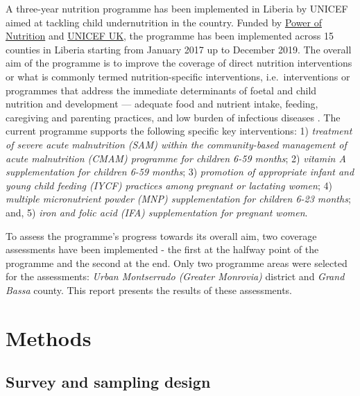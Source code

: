 \documentclass[12pt,a4paper]{article}
\begin{document}
A three-year nutrition programme has been implemented in Liberia by UNICEF aimed at tackling child undernutrition in the country. Funded by \href{http://www.powerofnutrition.org}{Power of Nutrition} and \href{https://www.unicef.org.uk}{UNICEF UK}, the programme has been implemented across 15 counties in Liberia starting from January 2017 up to December 2019. The overall aim of the programme is to improve the coverage of direct nutrition interventions or what is commonly termed nutrition-specific interventions, i.e.~interventions or programmes that address the immediate determinants of foetal and child nutrition and development --- adequate food and nutrient intake, feeding, caregiving and parenting practices, and low burden of infectious diseases \citep{Bhutta:2013ks, Ruel:2013kr}. The current programme supports the following specific key interventions: 1) \emph{treatment of severe acute malnutrition (SAM) within the community-based management of acute malnutrition (CMAM) programme for children 6-59 months}; 2) \emph{vitamin A supplementation for children 6-59 months}; 3) \emph{promotion of appropriate infant and young child feeding (IYCF) practices among pregnant or lactating women}; 4) \emph{multiple micronutrient powder (MNP) supplementation for children 6-23 months}; and, 5) \emph{iron and folic acid (IFA) supplementation for pregnant women}.

To assess the programme's progress towards its overall aim, two coverage assessments have been implemented - the first at the halfway point of the programme and the second at the end. Only two programme areas were selected for the assessments: \emph{Urban Montserrado (Greater Monrovia)} district and \emph{Grand Bassa} county. This report presents the results of these assessments.

\hypertarget{methods}{%
\section{Methods}\label{methods}}

\hypertarget{sample-design}{%
\subsection{Survey and sampling design}\label{sample-design}}
\end{document}
